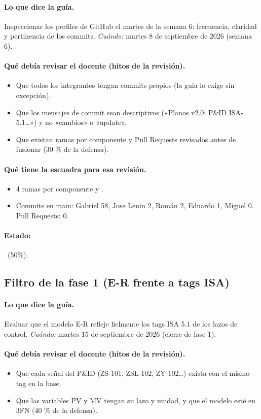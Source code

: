 \documentclass[a4paper,11pt]{article}
\begin{document}
\paragraph{Lo que dice la guía.} Inspeccionar los perfiles de GitHub el martes de la semana 6: frecuencia, claridad y pertinencia de los commits. \textit{Cuándo:} martes 8 de septiembre de 2026 (semana 6).
\paragraph{Qué debía revisar el docente (hitos de la revisión).}
\begin{itemize}
\item[$\square$] Que todos los integrantes tengan commits propios (la guía lo exige sin excepción).
\item[$\square$] Que los mensajes de commit sean descriptivos («Planos v2.0: P\&ID ISA-5.1…») y no «cambios» o «update».
\item[$\square$] Que existan ramas por componente y Pull Requests revisados antes de fusionar (30 \% de la defensa).
\end{itemize}
\paragraph{Qué tiene la escuadra para esa revisión.}
\begin{itemize}
\item 4 ramas por componente y .
\item Commits en main: Gabriel 58, Jose Lenin 2, Román 2, Eduardo 1, Miguel 0. Pull Requests: 0.
\end{itemize}
\paragraph{Estado:} \parcial~(50\%).
\subsection{Filtro de la fase 1 (E-R frente a tags ISA)}
\paragraph{Lo que dice la guía.} Evaluar que el modelo E-R refleje fielmente los tags ISA 5.1 de los lazos de control. \textit{Cuándo:} martes 15 de septiembre de 2026 (cierre de fase 1).
\paragraph{Qué debía revisar el docente (hitos de la revisión).}
\begin{itemize}
\item[$\square$] Que cada señal del P\&ID (ZS-101, ZSL-102, ZY-102…) exista con el mismo tag en la base.
\item[$\square$] Que las variables PV y MV tengan su lazo y unidad, y que el modelo esté en 3FN (40 \% de la defensa).
\end{itemize}
\end{document}
